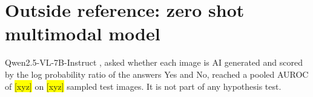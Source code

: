 \documentclass[11pt,a4paper]{article}
\newcommand{\xyz}[1][]{\colorbox{yellow}{[xyz]}}
\begin{document}
\section{Outside reference: zero shot multimodal model}

Qwen2.5-VL-7B-Instruct \citep{bai2025qwen25vl}, asked whether each image is AI generated and scored by the log probability ratio of the answers Yes and No, reached a pooled AUROC of \xyz[qwen.auroc]{} on \xyz[qwen.n]{} sampled test images. It is not part of any hypothesis test.



\end{document}
